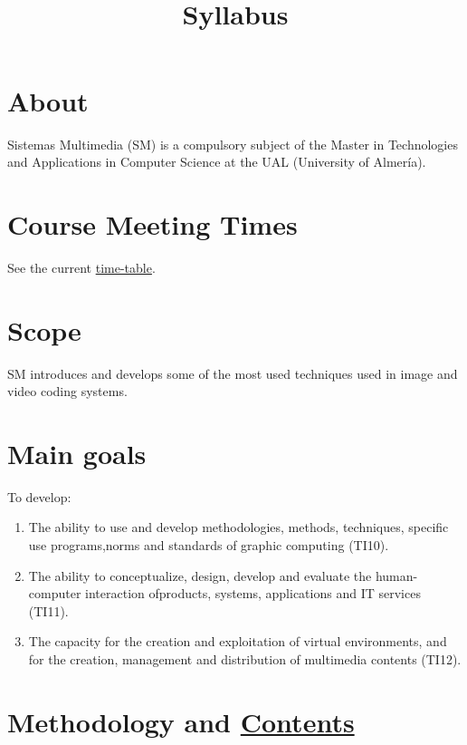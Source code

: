 

\title{\SM{} \\ Syllabus}

\maketitle
\tableofcontents

\section{About}

Sistemas Multimedia (SM) is a compulsory subject of the Master in
Technologies and Applications in Computer Science at the UAL
(University of Almería).

\section{Course Meeting Times}

See the current \href{https://www.ual.es/estudios/masteres/presentacion/plandeestudios/asignatura/7114/71142105}{time-table}.

\section{Scope}

SM introduces and develops some of the most used techniques used in
image and video coding systems.

\section{Main goals}

To develop:
\begin{enumerate}
\item The ability to use and develop methodologies, methods,
  techniques, specific use programs,norms and standards of graphic
  computing (TI10).
\item The ability to conceptualize, design, develop and evaluate the
  human-computer interaction ofproducts, systems, applications and IT
  services (TI11).
\item The capacity for the creation and exploitation of virtual
  environments, and for the creation, management and distribution of
  multimedia contents (TI12).
\end{enumerate}

\section{Methodology and \href{https://sistemas-multimedia.github.io/contents/}{Contents}}

